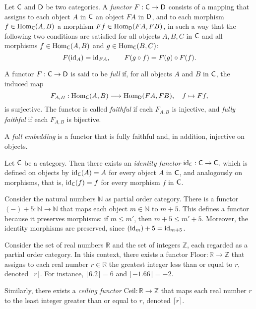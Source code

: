\begin{definition}
  Let $\mathsf{C}$ and $\mathsf{D}$ be two categories. A \emph{functor} $F: \mathsf{C} \to \mathsf{D}$ consists of a mapping that assigns to each object $A$ in $\mathsf{C}$ an object $FA$ in $\mathsf{D}$, and to each morphism $f \in \mathrm{Hom}_{\mathsf{C}}(A, B)$ a morphism $Ff \in \mathrm{Hom}_{\mathsf{D}}(FA, FB)$, in such a way that the following two conditions are satisfied for all objects $A, B, C$ in $\mathsf{C}$ and all morphisms $f \in \mathrm{Hom}_{\mathsf{C}}(A,B)$ and $g \in \mathrm{Hom}_{\mathsf{C}}(B,C)$:
\[
F(\mathrm{id}_A) = \mathrm{id}_{FA}, \qquad F(g \circ f) = F(g) \circ F(f).
\]

A functor $F: \mathsf{C} \to \mathsf{D}$ is said to be \emph{full} if, for all objects $A$ and $B$ in $\mathsf{C}$, the induced map
\[
F_{A,B}: \mathrm{Hom}_{\mathsf{C}}(A, B) \longrightarrow \mathrm{Hom}_{\mathsf{D}}(FA, FB), \quad f \mapsto Ff,
\]
is surjective. The functor is called \emph{faithful} if each $F_{A,B}$ is injective, and \emph{fully faithful} if each $F_{A,B}$ is bijective.

A \emph{full embedding} is a functor that is fully faithful and, in addition, injective on objects.
\end{definition}

\begin {example}
Let $\mathsf{C}$ be a category. Then there exists an \emph{identity functor} $\mathrm{id}_{\mathsf{C}} : \mathsf{C} \to \mathsf{C},$
which is defined on objects by $\mathrm{id}_{\mathsf{C}}(A) = A$ for every object $A$ in $\mathsf{C}$, and analogously on morphisms, that is, $\mathrm{id}_{\mathsf{C}}(f) = f$ for every morphism $f$ in $\mathsf{C}$.
\end{example}

\begin{example}
  Consider the natural numbers $\mathbb{N}$ as partial order category. There is a functor $(-) + 5 : \mathbb{N} \to \mathbb{N}$
that maps each object $m \in \mathbb{N}$ to $m + 5$. This defines a functor because it preserves morphisms: if $m \leq m'$, then $m + 5 \leq m' + 5$. Moreover, the identity morphisms are preserved, since $(\mathrm{id}_m) + 5 = \mathrm{id}_{m+5}$.
\end{example}

\begin{example}
  Consider the set of real numbers $\mathbb{R}$ and the set of integers $\mathbb{Z}$, each regarded as a partial order category. In this context, there exists a functor $\mathrm{Floor} : \mathbb{R} \to \mathbb{Z} $ that assigns to each real number $r \in \mathbb{R}$ the greatest integer less than or equal to $r$, denoted $\lfloor r \rfloor$. For instance, $\lfloor 6.2 \rfloor = 6$ and $\lfloor -1.66 \rfloor = -2$. 

Similarly, there exists a \emph{ceiling functor} $\mathrm{Ceil} : \mathbb{R} \to \mathbb{Z}$ that maps each real number $r$ to the least integer greater than or equal to $r$, denoted $\lceil r \rceil$.


\end{example}


